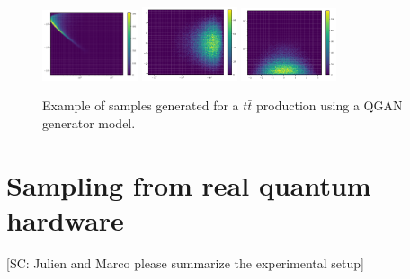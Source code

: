 \documentclass[twocolumn,preprintnumbers,superscriptaddress]{revtex4-2}
\begin{document}
\begin{figure}
  \includegraphics[width=0.25\textwidth]{plots/LHCttbar/s-t_FAKE_100000_100_3_5_4_10000_128_0.5.pdf}%
  \includegraphics[width=0.25\textwidth]{plots/LHCttbar/t-y_FAKE_100000_100_3_5_4_10000_128_0.5.pdf}%
  \includegraphics[width=0.25\textwidth]{plots/LHCttbar/y-s_FAKE_100000_100_3_5_4_10000_128_0.5.pdf}

  \caption{\label{fig:3dgauss}Example of samples generated for a $t\bar{t}$
  production using a QGAN generator model.}
\end{figure}

\section{Sampling from real quantum hardware}

{\color{red}[SC: Julien and Marco please summarize the experimental setup]}
\end{document}
